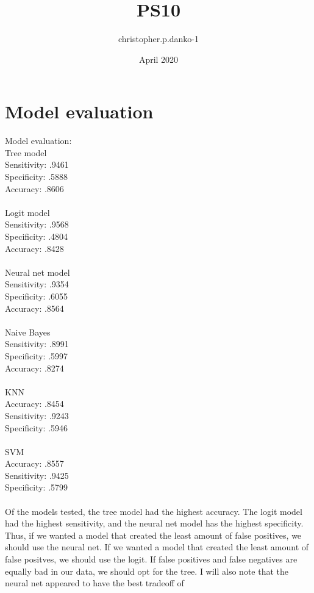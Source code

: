 \documentclass{article} \usepackage[utf8]{inputenc} \title{PS10}
\author{christopher.p.danko-1 } \date{April 2020}
\begin{document}
 
\maketitle \section{Model evaluation} Model evaluation:\\ Tree model\\ 
Sensitivity: .9461\\ Specificity: .5888\\ Accuracy: .8606\\ \\ Logit 
model\\ Sensitivity: .9568\\ Specificity: .4804\\ Accuracy: .8428\\ \\ 
Neural net model\\ Sensitivity: .9354\\ Specificity: .6055\\ Accuracy: 
.8564\\ \\ Naive Bayes\\ Sensitivity: .8991\\ Specificity: .5997\\ 
Accuracy: .8274\\ \\ KNN\\ Accuracy: .8454\\ Sensitivity: .9243\\ 
Specificity: .5946\\ \\ SVM\\ Accuracy: .8557\\ Sensitivity: .9425\\ 
Specificity: .5799\\ \\ Of the models tested, the tree model had the 
highest accuracy. The logit model had the highest sensitivity, and the 
neural net model has the highest specificity. Thus, if we wanted a model 
that created the least amount of false positives, we should use the 
neural net. If we wanted a model that created the least amount of false 
positves, we should use the logit. If false positives and false 
negatives are equally bad in our data, we should opt for the tree. I 
will also note that the neural net appeared to have the best tradeoff of 
\end{document}
